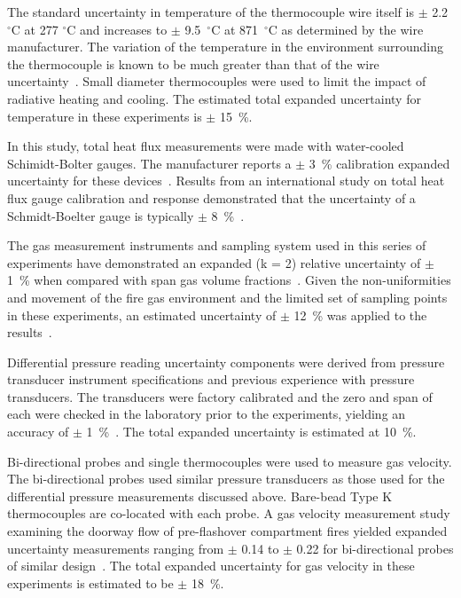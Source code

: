 \documentclass[12pt,oneside]{book}
\begin{document}
The standard uncertainty in temperature of the thermocouple wire itself is $\pm$ 2.2 $^{\circ}$C at 277 $^{\circ}$C and increases to $\pm$ 9.5~$^{\circ}$C at 871~$^{\circ}$C as determined by the wire manufacturer\cite{Omega:2004}. The variation of the temperature in the environment surrounding the thermocouple is known to be much greater than that of the wire uncertainty~\cite{Blevins:1999,Pitts:2003}. Small diameter thermocouples were used to limit the impact of radiative heating and cooling. The estimated total expanded uncertainty for temperature in these experiments is $\pm$ 15~\%.

In this study, total heat flux measurements were made with water-cooled Schimidt-Bolter gauges. The manufacturer reports a $\pm$ 3~\% calibration expanded uncertainty for these devices~\cite{Medtherm:2003}. Results from an international study on total heat flux gauge calibration and response demonstrated that the uncertainty of a Schmidt-Boelter gauge is typically $\pm$ 8~\%~\cite{Pitts:2006}.

The gas measurement instruments and sampling system used in this series of experiments have demonstrated an expanded (k = 2) relative uncertainty of $\pm$ 1~\% when compared with span gas volume fractions~\cite{Bundy:2007}. Given the non-uniformities and movement of the fire gas environment and the limited set of sampling points in these experiments, an estimated uncertainty of $\pm$ 12~\% was applied to the results~\cite{Lock:1}.

Differential pressure reading uncertainty components were derived from pressure transducer instrument specifications and previous experience with pressure transducers. The transducers were factory calibrated and the zero and span of each were checked in the laboratory prior to the experiments, yielding an accuracy of $\pm$ 1~\%~\cite{Setra:2002}. The total expanded uncertainty is estimated at 10~\%.

Bi-directional probes and single thermocouples were used to measure gas velocity. The bi-directional probes used similar pressure transducers as those used for the differential pressure measurements discussed above. Bare-bead Type K thermocouples are co-located with each probe. A gas velocity measurement study examining the doorway flow of pre-flashover compartment fires yielded expanded uncertainty measurements ranging from $\pm$ 0.14 to $\pm$ 0.22 for bi-directional probes of similar design~\cite{Bryant:FSJ2009}. The total expanded uncertainty for gas velocity in these experiments is estimated to be $\pm$ 18~\%.
\end{document}
